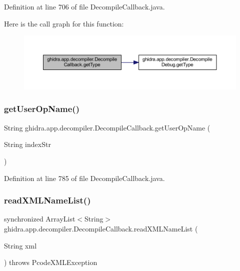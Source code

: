 Definition at line 706 of file Decompile\+Callback.\+java.

Here is the call graph for this function\+:
\nopagebreak
\begin{figure}[H]
\begin{center}
\leavevmode
\includegraphics[width=350pt]{classghidra_1_1app_1_1decompiler_1_1_decompile_callback_a6c420b7effd79c8fc02da2156f876dcc_cgraph}
\end{center}
\end{figure}
\mbox{\label{classghidra_1_1app_1_1decompiler_1_1_decompile_callback_a53e9fbea2f4fe1888ecb423802d0395c}} 
\subsubsection{\texorpdfstring{getUserOpName()}{getUserOpName()}}
{\footnotesize\ttfamily String ghidra.\+app.\+decompiler.\+Decompile\+Callback.\+get\+User\+Op\+Name (\begin{DoxyParamCaption}\item[{String}]{index\+Str }\end{DoxyParamCaption})\hspace{0.3cm}{\ttfamily [inline]}}



Definition at line 785 of file Decompile\+Callback.\+java.

\mbox{\label{classghidra_1_1app_1_1decompiler_1_1_decompile_callback_a418dbfbde7c2c37886f34a36fc6cfd74}} 
\subsubsection{\texorpdfstring{readXMLNameList()}{readXMLNameList()}}
{\footnotesize\ttfamily synchronized Array\+List$<$String$>$ ghidra.\+app.\+decompiler.\+Decompile\+Callback.\+read\+X\+M\+L\+Name\+List (\begin{DoxyParamCaption}\item[{String}]{xml }\end{DoxyParamCaption}) throws Pcode\+X\+M\+L\+Exception\hspace{0.3cm}{\ttfamily [inline]}}



